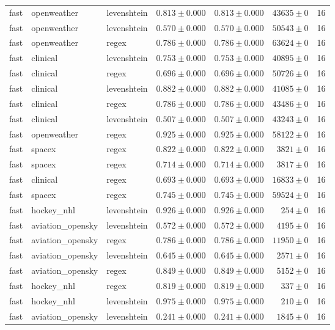 \begin{table}[htbp]
\begin{tabular}{l l l r r r r}
fast & openweather & levenshtein & $0.813\pm0.000$ & $0.813\pm0.000$ & $43635\pm0$ & 16 \\
fast & openweather & levenshtein & $0.570\pm0.000$ & $0.570\pm0.000$ & $50543\pm0$ & 16 \\
fast & openweather & regex & $0.786\pm0.000$ & $0.786\pm0.000$ & $63624\pm0$ & 16 \\
fast & clinical & levenshtein & $0.753\pm0.000$ & $0.753\pm0.000$ & $40895\pm0$ & 16 \\
fast & clinical & regex & $0.696\pm0.000$ & $0.696\pm0.000$ & $50726\pm0$ & 16 \\
fast & clinical & levenshtein & $0.882\pm0.000$ & $0.882\pm0.000$ & $41085\pm0$ & 16 \\
fast & clinical & regex & $0.786\pm0.000$ & $0.786\pm0.000$ & $43486\pm0$ & 16 \\
fast & clinical & levenshtein & $0.507\pm0.000$ & $0.507\pm0.000$ & $43243\pm0$ & 16 \\
fast & openweather & regex & $0.925\pm0.000$ & $0.925\pm0.000$ & $58122\pm0$ & 16 \\
fast & spacex & regex & $0.822\pm0.000$ & $0.822\pm0.000$ & $3821\pm0$ & 16 \\
fast & spacex & regex & $0.714\pm0.000$ & $0.714\pm0.000$ & $3817\pm0$ & 16 \\
fast & clinical & regex & $0.693\pm0.000$ & $0.693\pm0.000$ & $16833\pm0$ & 16 \\
fast & spacex & regex & $0.745\pm0.000$ & $0.745\pm0.000$ & $59524\pm0$ & 16 \\
fast & hockey\_nhl & levenshtein & $0.926\pm0.000$ & $0.926\pm0.000$ & $254\pm0$ & 16 \\
fast & aviation\_opensky & levenshtein & $0.572\pm0.000$ & $0.572\pm0.000$ & $4195\pm0$ & 16 \\
fast & aviation\_opensky & regex & $0.786\pm0.000$ & $0.786\pm0.000$ & $11950\pm0$ & 16 \\
fast & aviation\_opensky & levenshtein & $0.645\pm0.000$ & $0.645\pm0.000$ & $2571\pm0$ & 16 \\
fast & aviation\_opensky & regex & $0.849\pm0.000$ & $0.849\pm0.000$ & $5152\pm0$ & 16 \\
fast & hockey\_nhl & regex & $0.819\pm0.000$ & $0.819\pm0.000$ & $337\pm0$ & 16 \\
fast & hockey\_nhl & levenshtein & $0.975\pm0.000$ & $0.975\pm0.000$ & $210\pm0$ & 16 \\
fast & aviation\_opensky & levenshtein & $0.241\pm0.000$ & $0.241\pm0.000$ & $1845\pm0$ & 16 \\

\end{tabular}
\end{table}
